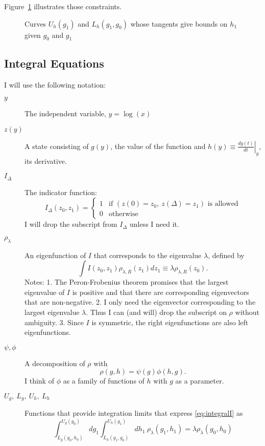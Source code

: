 \documentclass[]{article}
\begin{document}
Figure~\ref{fig:boundsC} illustrates those constraints.

\begin{figure}
  \centering
    \caption{Curves $U_h(g_1)$ and $L_h(g_1, g_0)$ whose tangents give
      bounds on $h_1$ given $g_0$ and $g_1$}
  \label{fig:boundsC}
\end{figure}

\subsection{Integral Equations}
\label{sec:integral-equations}

I will use the following notation:
\begin{description}
\item[$y$] The independent variable, $y = \log(x)$
\item[$z(y)$] A state consisting of $g(y)$, the value of the function
  and $h(y) \equiv \left. \frac{d g(t)}{d t} \right|_y$, its derivative.
\item[$I_\Delta$] The indicator function:
  \begin{equation}
    \label{eq:indicator}
    I_\Delta(z_0, z_1) =
    \begin{cases}
      1 & \text{if } \left( z(0) = z_0,~z(\Delta)=z_1
      \right) \text{ is allowed} \\
      0 & \text{otherwise}
    \end{cases}
  \end{equation}
  I will drop the subscript from $I_\Delta$ unless I need it.
\item[$\rho_{\lambda}$] An eigenfunction of $I$ that
  corresponds to the eigenvalue $\lambda$, defined by
  \begin{equation}
    \label{eq:integralI}
    \int I(z_0, z_1) \rho_{\lambda, R}(z_1) d z_1 \equiv \lambda
    \rho_{\lambda, R}(z_0).
  \end{equation}
  Notes: 1. The Peron-Frobenius theorem promises that the largest
  eigenvalue of $I$ is positive and that there are corresponding
  eigenvectors that are non-negative.  2. I only need the eigenvector
  corresponding to the largest eigenvalue $\lambda$.  Thus I can (and
  will) drop the subscript on $\rho$ without ambiguity. 3. Since $I$
  is symmetric, the right eigenfunctions are also left eigenfunctions.
\item[$\psi, \phi$] A decomposition of $\rho$ with
  \begin{equation*}
    \rho(g,h) = \psi(g) \phi(h,g).
  \end{equation*}
  I think of $\phi$ as a family of functions of $h$ with $g$ as a
  parameter.
\item[$U_g,~L_g,~U_h,~L_h$] Functions that provide integration limits
  that express \eqref{eq:integralI} as
  \begin{equation}
    \label{eq:integralUL_}
    \int_{L_g(g_0,h_0)}^{U_g(g_0)} dg_1
    \int_{L_h(g_1,g_0)}^{U_h(g_1)} dh_1~ \rho_\lambda(g_1, h_1) = \lambda
    \rho_\lambda(g_0, h_0)
  \end{equation}
\end{description}
\end{document}
